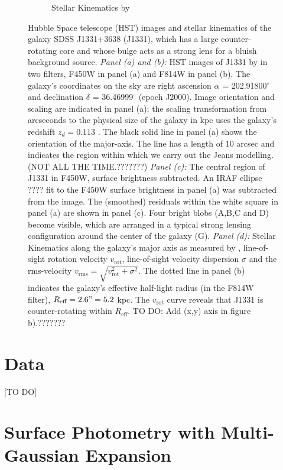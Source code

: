 \documentclass[useAMS,usenatbib]{mn2e}
\begin{document}
\begin{figure}
\begin{subfigure}{.5\textwidth}
  \caption{Stellar Kinematics by \citet{SWELLSV}}
  \label{fig:???}
\end{subfigure}
\caption{Hubble Space telescope (HST) images and stellar kinematics of the galaxy SDSS J1331+3638 (J1331), which has a large counter-rotating core and whose bulge acts as a strong lens for a bluish background source. \emph{Panel (a) and (b):} HST images of J1331 by \citet{SWELLSI} in two filters, F450W in panel (a) and F814W in panel (b). The galaxy's coordinates on the sky are right ascension $\alpha$ = 202.91800$^\circ$ and declination $\delta$ = 36.46999$^\circ$ (epoch J2000). Image orientation and scaling are indicated in panel (a); the scaling transformation from arcseconds to the physical size of the galaxy in kpc uses the galaxy's redshift $z_d = 0.113$ \citep{SWELLSIII}. The black solid line in panel (a) shows the orientation of the major-axis. The line has a length of 10 arcsec and indicates the region within which we carry out the Jeans modelling. (NOT ALL THE TIME.???????) \emph{Panel (c):} The central region of J1331 in F450W, surface brightness subtracted. An IRAF ellipse ???? fit to the F450W surface brightness in panel (a) was subtracted from the image. The (smoothed) residuals within the white square in panel (a) are shown in panel (c). Four bright blobs (A,B,C and D) become visible, which are arranged in a typical strong lensing configuration around the center of the galaxy (G). \emph{Panel (d):} Stellar Kinematics along the galaxy's major axis as measured by \citet{SWELLSV}, line-of-sight rotation velocity $v_\text{rot}$, line-of-sight velocity dispersion $\sigma$ and the rms-velocity $v_\text{rms} = \sqrt{v_\text{rot}^2 + \sigma^2}$. The dotted line in panel (b) indicates the galaxy's effective half-light radius (in the F814W filter), $R_\text{eff} = 2.6" = 5.2$ kpc. The $v_\text{rot}$ curve reveals that J1331 is counter-rotating within $R_\text{eff}$. TO DO: Add (x,y) axis in figure b).???????}
\label{fig:specialJ1331}
\end{figure}

\clearpage

\section{Data}

[TO DO]

\section{Surface Photometry with Multi-Gaussian Expansion} \label{kap:MGE}
\end{document}
